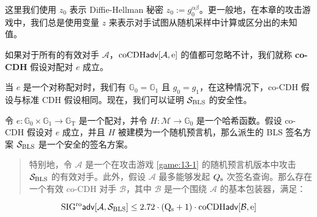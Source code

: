 这里我们使用 $z_0$ 表示 Diffie-Hellman 秘密 $z_0:=g_0^{\alpha\beta}$。更一般地，在本章的攻击游戏中，我们总是使用变量 $z$ 来表示对手试图从随机采样中计算或区分出的未知值。

\begin{definition}[co-CDH 假设。]\label{def:15-3}
如果对于所有的有效对手 $\mathcal{A}$，$\rm{coCDH\mathsf{adv}}[\mathcal{A},e]$ 的值都可忽略不计，我们就称 \textbf{co-CDH} 假设对配对 $e$ 成立。
\end{definition}

当 $e$ 是一个对称配对时，我们有 $\mathbb{G}_0=\mathbb{G}_1$ 且 $g_0=g_1$，在这种情况下，co-CDH 假设与标准 CDH 假设相同。现在，我们可以证明 $\mathcal{S}_{\rm BLS}$ 的安全性。

\begin{theorem}\label{theo:15-1}
令 $e: \mathbb{G}_0 \times \mathbb{G}_1 \rightarrow \mathbb{G}_\mathrm{T}$ 是一个配对，并令 $H: \mathcal{M} \rightarrow \mathbb{G}_0$ 是一个哈希函数。假设 co-CDH 假设对 $e$ 成立，并且 $H$ 被建模为一个随机预言机，那么派生的 BLS 签名方案 $\mathcal{S}_{\rm BLS}$ 是一个安全的签名方案。
\begin{quote}
特别地，令 $\mathcal{A}$ 是一个在攻击游戏 \ref{game:13-1} 的随机预言机版本中攻击 $\mathcal{S}_{\rm BLS}$ 的有效对手。此外，假设 $\mathcal{A}$ 最多能够发起 $Q_{\rm s}$ 次签名查询。那么存在一个有效 co-CDH 对手 $\mathcal{B}$，其中 $\mathcal{B}$ 是一个围绕 $\mathcal{A}$ 的基本包装器，满足：
\end{quote}
\begin{equation}\label{eq:15-6}
\rm{SIG^{ro}\mathsf{adv}}[\mathcal{A},\mathcal{S}_{BLS}]\leq2.72\cdot(Q_s+1)\cdot\rm{coCDH\mathsf{adv}}[\mathcal{B},e]
\end{equation}
\end{theorem}

